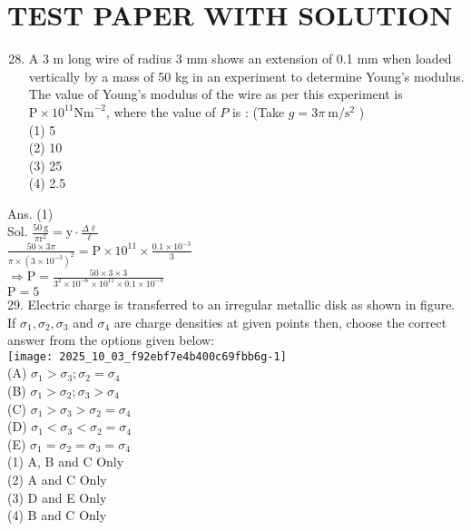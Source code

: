 \documentclass[10pt]{article}
\begin{document}
\section*{TEST PAPER WITH SOLUTION}
\begin{enumerate}
  \setcounter{enumi}{27}
  \item A 3 m long wire of radius 3 mm shows an extension of 0.1 mm when loaded vertically by a mass of 50 kg in an experiment to determine Young's modulus. The value of Young's modulus of the wire as per this experiment is \(\mathrm{P} \times 10^{11} \mathrm{Nm}^{-2}\), where the value of \(P\) is : (Take \(g=3 \pi \mathrm{~m} / \mathrm{s}^{2}\) )\\
(1) 5\\
(2) 10\\
(3) 25\\
(4) 2.5
\end{enumerate}

Ans. (1)\\
Sol. \(\frac{50 \mathrm{~g}}{\pi \mathrm{r}^{2}}=\mathrm{y} \cdot \frac{\Delta \ell}{\ell}\)\\
\(\frac{50 \times 3 \pi}{\pi \times\left(3 \times 10^{-3}\right)^{2}}=\mathrm{P} \times 10^{11} \times \frac{0.1 \times 10^{-3}}{3}\)\\
\(\Rightarrow \mathrm{P}=\frac{50 \times 3 \times 3}{3^{2} \times 10^{-6} \times 10^{11} \times 0.1 \times 10^{-3}}\)\\
\(\mathrm{P}=5\)\\
29. Electric charge is transferred to an irregular metallic disk as shown in figure. If \(\sigma_{1}, \sigma_{2}, \sigma_{3}\) and \(\sigma_{4}\) are charge densities at given points then, choose the correct answer from the options given below:\\
\texttt{[image: 2025\_10\_03\_f92ebf7e4b400c69fbb6g-1]}\\
(A) \(\sigma_{1}>\sigma_{3} ; \sigma_{2}=\sigma_{4}\)\\
(B) \(\sigma_{1}>\sigma_{2} ; \sigma_{3}>\sigma_{4}\)\\
(C) \(\sigma_{1}>\sigma_{3}>\sigma_{2}=\sigma_{4}\)\\
(D) \(\sigma_{1}<\sigma_{3}<\sigma_{2}=\sigma_{4}\)\\
(E) \(\sigma_{1}=\sigma_{2}=\sigma_{3}=\sigma_{4}\)\\
(1) A, B and C Only\\
(2) A and C Only\\
(3) D and E Only\\
(4) B and C Only
\end{document}

